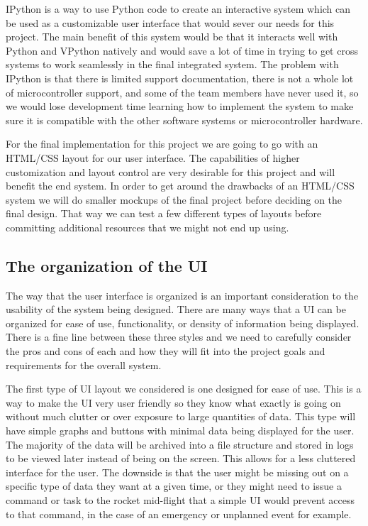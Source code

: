 \documentclass[10pt,draftclsnofoot,onecolumn]{IEEEtran}
\begin{document}
	IPython is a way to use Python code to create an interactive system which can be used as a customizable user interface that would sever our needs for this project. The main benefit of this system would be that it interacts well with Python and VPython natively and would save a lot of time in trying to get cross systems to work seamlessly in the final integrated system. The problem with IPython is that there is limited support documentation, there is not a whole lot of microcontroller support, and some of the team members have never used it, so we would lose development time learning how to implement the system to make sure it is compatible with the other software systems or microcontroller hardware.\par
	For the final implementation for this project we are going to go with an HTML/CSS layout for our user interface. The capabilities of higher customization and layout control are very desirable for this project and will benefit the end system. In order to get around the drawbacks of an HTML/CSS system we will do smaller mockups of the final project before deciding on the final design. That way we can test a few different types of layouts before committing additional resources that we might not end up using.\par

\subsection{The organization of the UI}
The way that the user interface is organized is an important consideration to the usability of the system being designed. There are many ways that a UI can be organized for ease of use, functionality, or density of information being displayed. There is a fine line between these three styles and we need to carefully consider the pros and cons of each and how they will fit into the project goals and requirements for the overall system. \par

	The first type of UI layout we considered is one designed for ease of use. This is a way to make the UI very user friendly so they know what exactly is going on without much clutter or over exposure to large quantities of data. This type will have simple graphs and buttons with minimal data being displayed for the user. The majority of the data will be archived into a file structure and stored in logs to be viewed later instead of being on the screen. This allows for a less cluttered interface for the user. The downside is that the user might be missing out on a specific type of data they want at a given time, or they might need to issue a command or task to the rocket mid-flight that a simple UI would prevent access to that command, in the case of an emergency or unplanned event for example. \par
	
\end{document}
